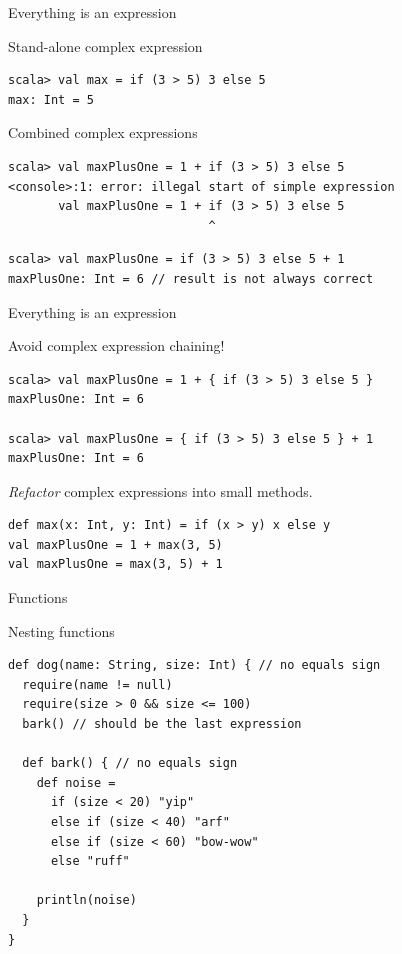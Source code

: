 \begin{frame}[fragile]{Everything is an expression}
\begin{exampleblock}{Stand-alone complex expression }
\begin{lstlisting}
scala> val max = if (3 > 5) 3 else 5
max: Int = 5
\end{lstlisting}
\end{exampleblock}
\pause
\begin{alertblock}{Combined complex expressions}
\begin{lstlisting}
scala> val maxPlusOne = 1 + if (3 > 5) 3 else 5
<console>:1: error: illegal start of simple expression
       val maxPlusOne = 1 + if (3 > 5) 3 else 5
                            ^
\end{lstlisting}
\pause
\begin{lstlisting}
scala> val maxPlusOne = if (3 > 5) 3 else 5 + 1
maxPlusOne: Int = 6 // result is not always correct
\end{lstlisting}
\end{alertblock}
\end{frame}
\begin{frame}[fragile]{Everything is an expression}
\begin{exampleblock}{\alert{Avoid} complex expression chaining!}
\begin{lstlisting}
scala> val maxPlusOne = 1 + { if (3 > 5) 3 else 5 }
maxPlusOne: Int = 6

scala> val maxPlusOne = { if (3 > 5) 3 else 5 } + 1
maxPlusOne: Int = 6
\end{lstlisting}
\end{exampleblock}
\pause
\begin{exampleblock}{\emph{Refactor} complex expressions into small methods.}
\begin{lstlisting}
def max(x: Int, y: Int) = if (x > y) x else y
val maxPlusOne = 1 + max(3, 5)
val maxPlusOne = max(3, 5) + 1
\end{lstlisting}
\end{exampleblock}
\end{frame}


\begin{frame}[fragile]{Functions}
\begin{alertblock}{Nesting functions}
\begin{lstlisting}
def dog(name: String, size: Int) { // no equals sign
  require(name != null)
  require(size > 0 && size <= 100)
  bark() // should be the last expression

  def bark() { // no equals sign
    def noise =
      if (size < 20) "yip"
      else if (size < 40) "arf"
      else if (size < 60) "bow-wow"
      else "ruff"
        
    println(noise)
  }
}
\end{lstlisting}
\end{alertblock}
\end{frame}


